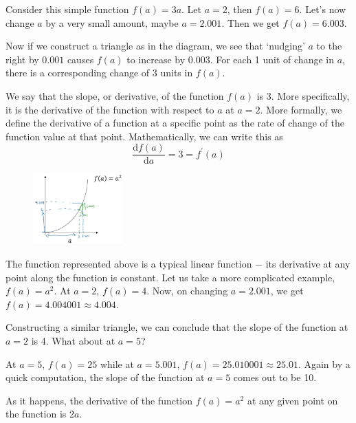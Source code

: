 \documentclass{article}[a4paper,12pt]
\theoremstyle{definition}
\begin{document}
Consider this simple function $f(a)=3a$. Let $a=2$, then $f(a)=6$. Let's now change $a$ by a very small amount, maybe $a=2.001$. Then we get $f(a)=6.003$.
\vspace{6pt}

Now if we construct a triangle as in the diagram, we see that `nudging' $a$ to the right by $0.001$ causes $f(a)$ to increase by $0.003$. For each 1 unit of change in $a$, there is a corresponding change of 3 units in $f(a)$. 
\vspace{6pt}

We say that the slope, or derivative, of the function $f(a)$ is 3. More specifically, it is the derivative of the function with respect to $a$ at $a=2$. More formally, we define the derivative of a function at a specific point as the rate of change of the function value at that point. Mathematically, we can write this as
$$\frac{\text{d}f(a)}{\text{d}a}=3=f^{\prime}(a)$$

\begin{figure}
\centering \includegraphics[width=0.31\textwidth]{x_square.png}
\end{figure}
\vspace{6pt}

The function represented above is a typical linear function $-$ its derivative at any point along the function is constant. Let us take a more complicated example, $f(a)=a^2$. At $a=2$, $f(a)=4$. Now, on changing $a=2.001$, we get $f(a)=4.004001\approx4.004$. 
\vspace{6pt}

Constructing a similar triangle, we can conclude that the slope of the function at $a=2$ is 4. What about at $a=5$?
\vspace{6pt}

At $a=5$, $f(a)=25$ while at $a=5.001$, $f(a)=25.010001\approx 25.01$. Again by a quick computation, the slope of the function at $a=5$ comes out to be 10.
\vspace{6pt}

As it happens, the derivative of the function $f(a)=a^2$ at any given point on the function is $2a$. 

\vspace{6pt}
\end{document}
